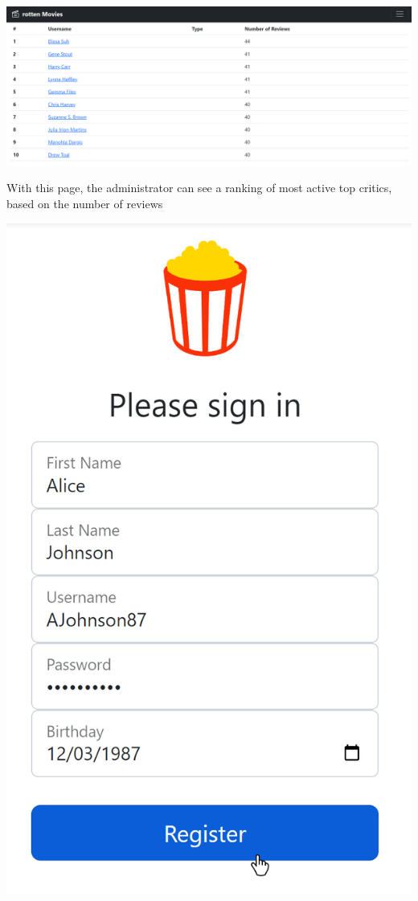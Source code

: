 \includegraphics[scale=0.45]{../../../images/user_manual/most_followed_top_critic.png} 

With this page, the administrator can see a ranking of most active top critics, based on the number of reviews

\includegraphics[scale=0.45]{../../../images/user_manual/top_critic_registration.png} 


